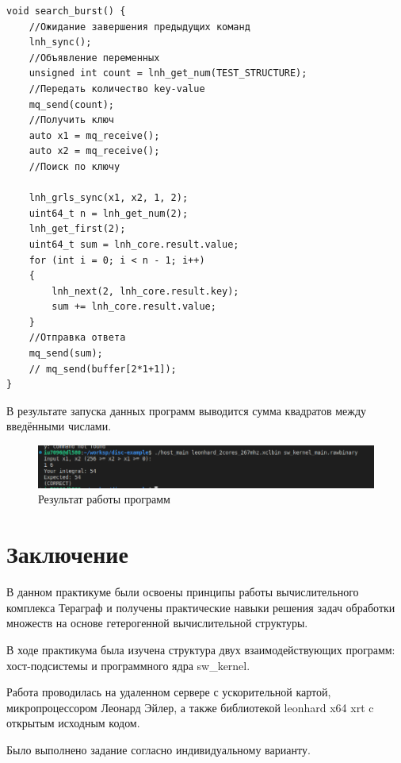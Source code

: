 \begin{lstlisting}[label=code, caption=Код программы sw\_kernel\_main.c]
void search_burst() {
    //Ожидание завершения предыдущих команд
    lnh_sync(); 
    //Объявление переменных
    unsigned int count = lnh_get_num(TEST_STRUCTURE);
    //Передать количество key-value
    mq_send(count);
    //Получить ключ
    auto x1 = mq_receive();
    auto x2 = mq_receive();
    //Поиск по ключу
    
    lnh_grls_sync(x1, x2, 1, 2);
    uint64_t n = lnh_get_num(2);
    lnh_get_first(2);
    uint64_t sum = lnh_core.result.value;
    for (int i = 0; i < n - 1; i++)
	{
        lnh_next(2, lnh_core.result.key);
        sum += lnh_core.result.value;
    }
    //Отправка ответа
	mq_send(sum);
    // mq_send(buffer[2*1+1]);
}
\end{lstlisting}
\captionsetup{singlelinecheck = false, justification=centering}

\newpage
В результате запуска данных программ выводится сумма квадратов между введёнными числами.

\begin{figure}[h!]
	\begin{center}
		\includegraphics[scale=0.54]{res}
	\end{center}
	\caption{Результат работы программ}
\end{figure}

\chapter*{Заключение}

В данном практикуме были освоены принципы работы вычислительного комплекса 
Тераграф и получены практические навыки решения задач обработки 
множеств на основе гетерогенной вычислительной структуры. 

В ходе практикума была изучена структура двух 
взаимодействующих программ: хост-подсистемы и программного ядра 
sw\_kernel. 

Работа проводилась на удаленном сервере с ускорительной 
картой, микропроцессором Леонард Эйлер, а также библиотекой 
leonhard x64 xrt c открытым исходным кодом.

Было выполнено задание согласно индивидуальному варианту.
